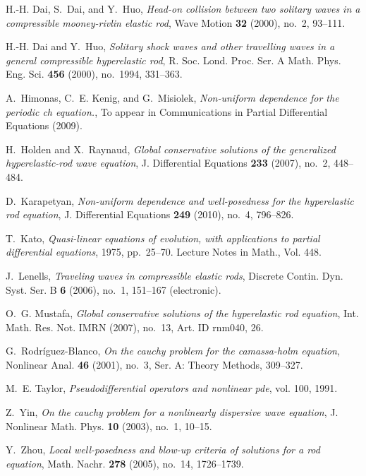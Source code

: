 \documentclass[12pt,reqno]{amsart}
\numberwithin{equation}{section}  %
\numberwithin{figure}{section}
\begin{document}
\begin{thebibliography}{HKM09}
H.-H. Dai, S.~Dai, and Y.~Huo, \emph{Head-on collision between two solitary
  waves in a compressible mooney-rivlin elastic rod}, Wave Motion \textbf{32}
  (2000), no.~2, 93--111.

H.-H. Dai and Y.~Huo, \emph{Solitary shock waves and other travelling waves in
  a general compressible hyperelastic rod}, R. Soc. Lond. Proc. Ser. A Math.
  Phys. Eng. Sci. \textbf{456} (2000), no.~1994, 331--363.

A.~Himonas, C.~E. Kenig, and G.~Misiolek, \emph{Non-uniform dependence for the
  periodic ch equation.}, To appear in Communications in Partial Differential
  Equations (2009).

H.~Holden and X.~Raynaud, \emph{Global conservative solutions of the
  generalized hyperelastic-rod wave equation}, J. Differential Equations
  \textbf{233} (2007), no.~2, 448--484.

D.~Karapetyan, \emph{Non-uniform dependence and well-posedness for the
  hyperelastic rod equation}, J. Differential Equations \textbf{249} (2010),
  no.~4, 796--826.

T.~Kato, \emph{Quasi-linear equations of evolution, with applications to
  partial differential equations}, 1975, pp.~25--70. Lecture Notes in Math.,
  Vol. 448.

J.~Lenells, \emph{Traveling waves in compressible elastic rods}, Discrete
  Contin. Dyn. Syst. Ser. B \textbf{6} (2006), no.~1, 151--167 (electronic).

O.~G. Mustafa, \emph{Global conservative solutions of the hyperelastic rod
  equation}, Int. Math. Res. Not. IMRN (2007), no.~13, Art. ID rnm040, 26.

G.~Rodr\'iguez-Blanco, \emph{On the cauchy problem for the camassa-holm
  equation}, Nonlinear Anal. \textbf{46} (2001), no.~3, Ser. A: Theory Methods,
  309--327.

M.~E. Taylor, \emph{Pseudodifferential operators and nonlinear pde}, vol. 100,
  1991.

Z.~Yin, \emph{On the cauchy problem for a nonlinearly dispersive wave
  equation}, J. Nonlinear Math. Phys. \textbf{10} (2003), no.~1, 10--15.

Y.~Zhou, \emph{Local well-posedness and blow-up criteria of solutions for a rod
  equation}, Math. Nachr. \textbf{278} (2005), no.~14, 1726--1739.

\end{thebibliography}
%
%
%
%
%
\end{document}
